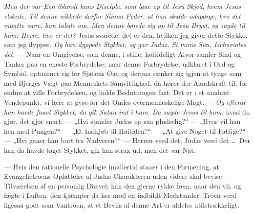 \documentclass[12pt,a4paper]{book}
\begin{document}
\emph{Men der var Een iblandt hans Disciple, som laae op til Jesu Skjod, hvem Jesus elskede.
Til denne nikkede derfor Simon Peder, at han skulde udspørge, hvo det maatte være, han talede
om. Men denne bøiede sig op til Jesu Bryst, og sagde til ham: Herre, hvo er det?} Jesus
svarede: det er den, hvilken jeg giver dette Stykke, som jeg dypper. \emph{Og han dyppede
Stykket, og gav Judas, Si\-%
mons Søn, Ischariotes det.} --- Naar en Omgivelse, som denne, i stille, høitideligt Alvor
samler Sind og Tanker paa en eneste Forbrydelse; naar denne Forbrydelse, udklaret i Ord og
Symbol, optaarner sig for Sjælens Øie, og derpaa sænker sig igjen at tynge som med Bjerges
Vægt paa Menneskets Samvittighed, da hører der Aandskraft til, for endnu at ville
Forbrydelsen, og holde Beslutningen fast. Det er i et saadant Vendepunkt, vi lære at gyse for
det Ondes overmenneskelige Magt. --- \emph{Og efterat han havde faaet Stykket, da gik Satan
ind i ham. Da sagde Jesus til ham:} hvad du gjør, det gjør snart. --- „Hvi stander Judas op
saa pludselig?“ --- „Hvor vil han hen med Pungen?“ --- „Et Indkjøb til Høitiden?“ --- „At
give Noget til Fattige?“ --- „Hvi gaaer han bort fra Nadveren?“ --- Herren veed det; Judas
veed det \dots\ {\large Der han da havde taget Stykket, gik han strax ud, men det var Nat.}

--- Hvis den rationelle Psychologie imidlertid staaer i den Formening, at Evangelietroens
Opfattelse af Judas-Charakteren uden videre skal bevise Tilværelsen af en personlig Diævel;
kan den gjerne rykke frem, naar den vil, og fægte i Luften: den kjæmper da her mod en indbildt
Modstander. Troen veed ligesaa godt som Vantroen, at et Beviis af denne Art er aldeles
utilstrækkeligt.
\end{document}
